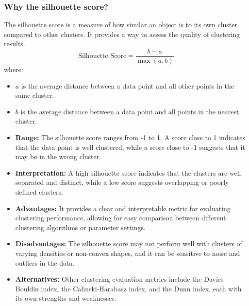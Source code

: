 \begin{frame}
	\frametitle{Why the silhouette score?}
    \tiny{
    The silhouette score is a measure of how similar an object is to its own cluster compared to other clusters. It provides a way to assess the quality of clustering results.
    \begin{equation}
        \text{Silhouette Score} = \frac{b - a}{\max\left(a, b\right)}
    \end{equation}
    where:
    \begin{itemize}
        \item \( a \) is the average distance between a data point and all other points in the same cluster.
        \item \( b \) is the average distance between a data point and all points in the nearest cluster.
    \end{itemize}

    \begin{itemize}
        \item \textbf{Range:} The silhouette score ranges from -1 to 1. A score close to 1 indicates that the data point is well clustered, while a score close to -1 suggests that it may be in the wrong cluster.
        \item \textbf{Interpretation:} A high silhouette score indicates that the clusters are well separated and distinct, while a low score suggests overlapping or poorly defined clusters.
        \item \textbf{Advantages:} It provides a clear and interpretable metric for evaluating clustering performance, allowing for easy comparison between different clustering algorithms or parameter settings.
        \item \textbf{Disadvantages:} The silhouette score may not perform well with clusters of varying densities or non-convex shapes, and it can be sensitive to noise and outliers in the data.
        \item \textbf{Alternatives:} Other clustering evaluation metrics include the Davies-Bouldin index, the Calinski-Harabasz index, and the Dunn index, each with its own strengths and weaknesses.
    \end{itemize}
    }
\end{frame}
